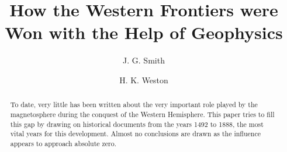 \documentclass[jgrga]{aguplus}                     %
\begin{document}
\title{How the Western Frontiers were Won with the Help of Geophysics}

%
%
\author{J. G. Smith}

\author{H. K. Weston}




\begin{abstract}
To date, very little has been written about the very important role
played by the magnetosphere during the conquest of the Western Hemisphere.
This paper tries to fill this gap by drawing on historical documents from the
years 1492 to 1888, the most vital years for this development. Almost no
conclusions are drawn as the influence appears to approach absolute zero.
\end{abstract}
\end{document}
